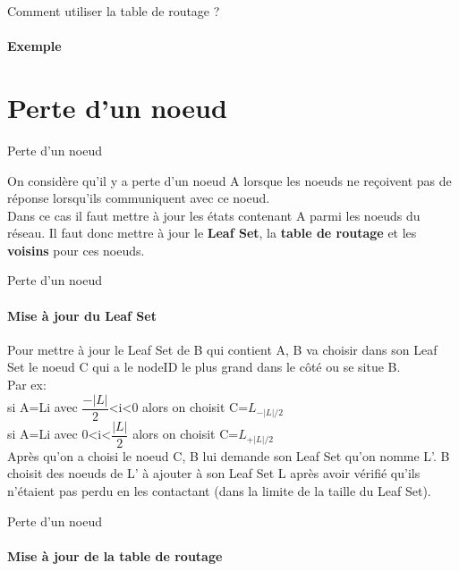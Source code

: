 \documentclass[french]{beamer}
\begin{document}
\begin{frame}{Comment utiliser la table de routage ?}
\framesubtitle{Exemple}
\end{frame}

\section{Perte d'un noeud}
\begin{frame}{Perte d'un noeud}
\begin{large}
On considère qu'il y a perte d'un noeud A lorsque les noeuds ne reçoivent pas de réponse lorsqu'ils communiquent avec ce noeud.\\ Dans ce cas il faut mettre à jour les états contenant A parmi les noeuds du réseau. Il faut donc mettre à jour le \textbf{Leaf Set}, la \textbf{table de routage} et les \textbf{voisins} pour ces noeuds.
\end{large}
\end{frame}

\begin{frame}{Perte d'un noeud}
\framesubtitle{Mise à jour du Leaf Set}
Pour mettre à jour le Leaf Set de B qui contient A, B va choisir dans son Leaf Set le noeud C qui a le nodeID le plus grand dans le côté ou se situe B. \\
Par ex: \\si A=Li avec $ \dfrac{-|L|}{2} $<i<0 alors on choisit C=$ L_{-|L|/2} $\\
si A=Li avec 0<i<$ \dfrac{|L|}{2} $ alors on choisit C=$ L_{+|L|/2} $\\
Après qu'on a choisi le noeud C, B lui demande son Leaf Set qu'on nomme L'. B choisit des noeuds de L' à ajouter à son Leaf Set L après avoir vérifié qu'ils n'étaient pas perdu en les contactant (dans la limite de la taille du Leaf Set).
\end{frame}
\begin{frame}{Perte d'un noeud}
\framesubtitle{Mise à jour de la table de routage}
\end{frame}
\end{document}
